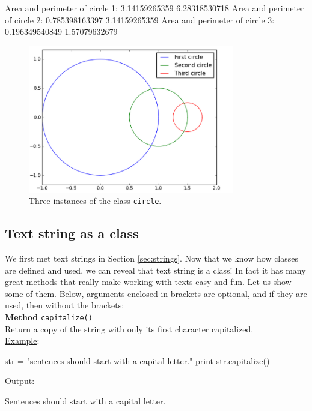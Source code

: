 \begin{bluecode}
Area and perimeter of circle 1: 3.14159265359 6.28318530718
Area and perimeter of circle 2: 0.785398163397 3.14159265359
Area and perimeter of circle 3: 0.196349540849 1.57079632679
\end{bluecode}

\begin{figure}[!ht]
\begin{center}
\includegraphics[width=0.8\textwidth]{imgp/3circ.png}
\end{center}
\vspace{-2mm}
\caption{Three instances of the class {\tt circle}.}
\label{fig:3circ}
\end{figure}

\subsection{Text string as a class} \label{subsec:textstrclass}

We first met text strings in Section \ref{sec:strings}. Now that 
we know how classes are defined and used, we can reveal that 
text string is a class! In fact it has many great methods that 
really make working with texts easy and fun. Let us show some 
of them. Below, arguments enclosed in brackets are optional,
and if they are used, then without the brackets:\\

\noindent
{\bf Method} {\tt capitalize()}\\

\noindent
Return a copy of the string with only its first character capitalized.\\

\noindent
\underline{Example}:
\begin{bluecode}
str = "sentences should start with a capital letter."
print str.capitalize()
\end{bluecode}
\underline{Output}:
\begin{bluecode}
Sentences should start with a capital letter.
\end{bluecode}
\vspace{4mm}

